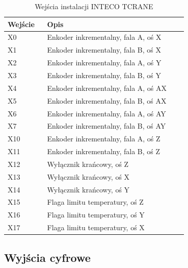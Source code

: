 \documentclass{mwrep}
\begin{document}
\begin{table}[H]
    \centering
    \begin{tabular}{|p{0.1\linewidth}|p{0.6\linewidth}|}
	\hline
	Wejście & Opis \\ \hline
	X0 & Enkoder inkrementalny, fala A, oś X              \\ \hline
	X1 & Enkoder inkrementalny, fala B, oś X                   \\ \hline
	X2 & Enkoder inkrementalny, fala A, oś Y 		         \\  \hline
	X3 & Enkoder inkrementalny, fala B, oś Y            \\ \hline
	X4 & Enkoder inkrementalny, fala A, oś AX 		         \\  \hline
    X5 & Enkoder inkrementalny, fala B, oś AX           \\ \hline
    X6 & Enkoder inkrementalny, fala A, oś AY 		         \\  \hline
    X7 & Enkoder inkrementalny, fala B, oś AY            \\ \hline
    X10 & Enkoder inkrementalny, fala A, oś Z  		         \\  \hline
    X11 & Enkoder inkrementalny, fala B, oś Z            \\ \hline
    X12 & Wyłącznik krańcowy, oś Z 		         \\  \hline
    X13 & Wyłącznik krańcowy, oś X 		         \\  \hline
    X14 & Wyłącznik krańcowy, oś Y 		         \\  \hline
    X15 & Flaga limitu temperatury, oś Z 		         \\  \hline
    X16 & Flaga limitu temperatury, oś Y 		         \\  \hline
    X17 & Flaga limitu temperatury, oś X 		         \\  \hline
	\end{tabular}
    \caption{Wejścia instalacji INTECO TCRANE}
\end{table}
\newpage

\subsection{Wyjścia cyfrowe}
\label{Opis::IO::Output}
\end{document}
